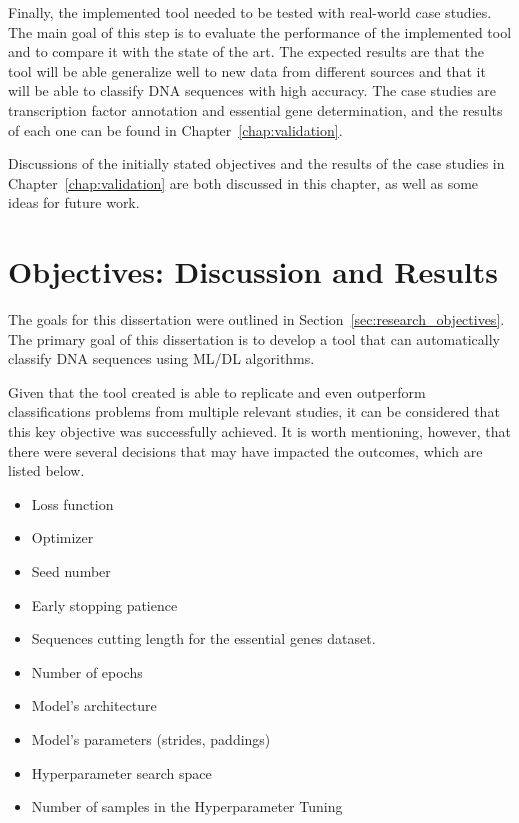 Finally, the implemented tool needed to be tested with real-world case studies. The main goal of this step is to evaluate the performance of the implemented tool and to compare it with the state of the art. The expected results are that the tool will be able generalize well to new data from different sources and that it will be able to classify \gls{DNA} sequences with high accuracy. The case studies are transcription factor annotation and essential gene determination, and the results of each one can be found in Chapter~\ref{chap:validation}.

Discussions of the initially stated objectives and the results of the case studies in Chapter~\ref{chap:validation} are both discussed in this chapter, as well as some ideas for future work.

\section{Objectives: Discussion and Results}

The goals for this dissertation were outlined in Section~\ref{sec:research_objectives}. The primary goal of this dissertation is to develop a tool that can automatically classify \gls{DNA} sequences using \gls{ML}/\gls{DL} algorithms. 

Given that the tool created is able to replicate and even outperform classifications problems from multiple relevant studies, it can be considered that this key objective was successfully achieved. It is worth mentioning, however, that there were several decisions that may have impacted the outcomes, which are listed below.

\begin{itemize}
    \item Loss function
    \item Optimizer
    \item Seed number
    \item Early stopping patience
    \item Sequences cutting length for the essential genes dataset.
    \item Number of epochs
    \item Model's architecture
    \item Model's parameters (strides, paddings)
    \item Hyperparameter search space
    \item Number of samples in the Hyperparameter Tuning
\end{itemize}

